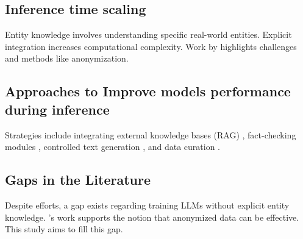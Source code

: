 \subsection{Inference time scaling}
Entity knowledge involves understanding specific real-world entities. Explicit integration increases computational complexity. Work by \cite{hermann2015teaching} highlights challenges and methods like anonymization.

\subsection{Approaches to Improve models performance during inference}
Strategies include integrating external knowledge bases (RAG) \cite{guu2020retrieval, lewis2020retrieval}, fact-checking modules \cite{zellers2019defending}, controlled text generation \cite{keskar2019ctrl}, and data curation \cite{gundavarapu2024machine}.

\subsection{Gaps in the Literature}
Despite efforts, a gap exists regarding training LLMs without explicit entity knowledge. \cite{hermann2015teaching}'s work supports the notion that anonymized data can be effective. This study aims to fill this gap.
\clearpage %